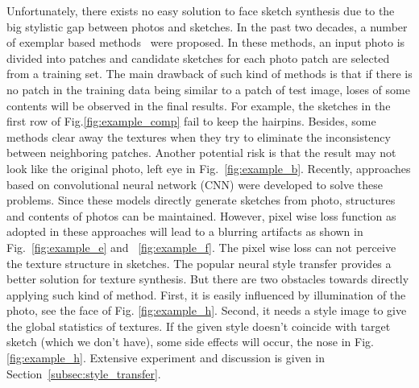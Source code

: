 \documentclass[10pt,twocolumn,letterpaper]{article}
\begin{document}
Unfortunately, there exists no easy solution to face sketch synthesis due to the big stylistic gap between photos and sketches. In the past two decades, a number of exemplar based methods~\cite{wang2009face,song2014real, zhang2010lighting,zhou2012markov} were proposed. In these methods, an input photo is divided into patches and candidate sketches for each photo patch are selected from a training set. The main drawback of such kind of methods is that if there is no patch in the training data being similar to a patch of test image, loses of some contents will be observed in the final results. For example, the sketches in the first row of Fig.\ref{fig:example_comp} fail to keep the hairpins. Besides, some methods \cite{song2014real,zhou2012markov} clear away the textures when they try to eliminate the inconsistency between neighboring patches. Another potential risk is that the result may not look like the original photo, \eg left eye in Fig.~\ref{fig:example_b}. Recently, approaches \cite{zhang2017content,zhang2015end} based on convolutional neural network (CNN) were developed to solve these problems. Since these models directly generate sketches from photo, structures and contents of photos can be maintained. However, pixel wise loss function as adopted in these approaches will lead to a blurring artifacts as shown in Fig.~\ref{fig:example_e} and ~\ref{fig:example_f}. The pixel wise loss can not perceive the texture structure in sketches.  The popular neural style transfer provides a better solution for texture synthesis. But there are two obstacles towards directly applying such kind of method. First, it is easily influenced by illumination of the photo, see the face of Fig. \ref{fig:example_h}. Second, it needs a style image to give the global statistics of textures. If the given style doesn't coincide with target sketch (which we don't have), some side effects will occur, \eg the nose in Fig. \ref{fig:example_h}. Extensive experiment and discussion is given in Section~\ref{subsec:style_transfer}. 
\end{document}
